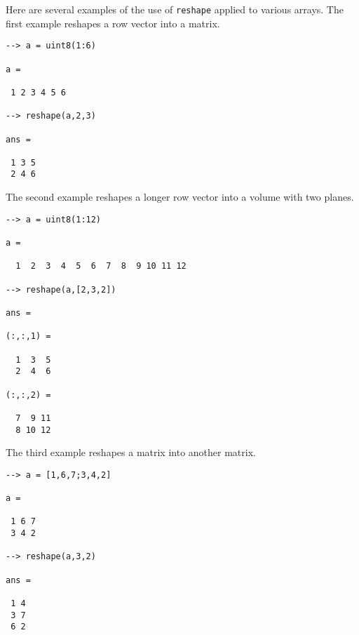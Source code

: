 Here are several examples of the use of \verb|reshape| applied to
various arrays.  The first example reshapes a row vector into a 
matrix.
\begin{verbatim}
--> a = uint8(1:6)

a = 

 1 2 3 4 5 6 

--> reshape(a,2,3)

ans = 

 1 3 5 
 2 4 6 
\end{verbatim}
The second example reshapes a longer row vector into a volume with 
two planes.
\begin{verbatim}
--> a = uint8(1:12)

a = 

  1  2  3  4  5  6  7  8  9 10 11 12 

--> reshape(a,[2,3,2])

ans = 

(:,:,1) = 

  1  3  5 
  2  4  6 

(:,:,2) = 

  7  9 11 
  8 10 12 
\end{verbatim}
The third example reshapes a matrix into another matrix.
\begin{verbatim}
--> a = [1,6,7;3,4,2]

a = 

 1 6 7 
 3 4 2 

--> reshape(a,3,2)

ans = 

 1 4 
 3 7 
 6 2 
\end{verbatim}
